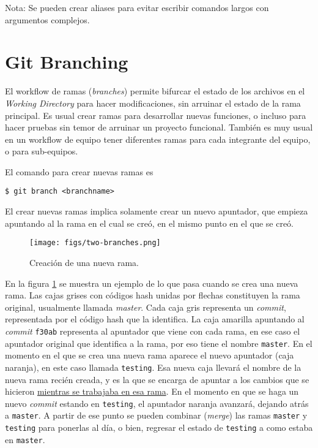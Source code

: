 \documentclass[spanish, 12pt, a4paper]{article}
\begin{document}
Nota: Se pueden crear aliases para evitar escribir comandos largos con
argumentos complejos.

\section{Git Branching}
El workflow de ramas (\textit{branches}) permite bifurcar el estado de los
archivos en el \textit{Working Directory} para hacer modificaciones, sin
arruinar el estado de la rama principal.
Es usual crear ramas para desarrollar nuevas funciones, o incluso para hacer
pruebas sin temor de arruinar un proyecto funcional.
También es muy usual en un workflow de equipo tener diferentes ramas para cada
integrante del equipo, o para sub-equipos.

El comando para crear nuevas ramas es
\begin{lstlisting}
$ git branch <branchname>
\end{lstlisting}

El crear nuevas ramas implica solamente crear un nuevo apuntador, que empieza
apuntando al la rama en el cual se creó, en el mismo punto en el que se creó.

\begin{figure}[h]
  \centering
  \texttt{[image: figs/two-branches.png]}
  \caption{Creación de una nueva rama.}
  \label{fig:two-branches}
\end{figure}

En la figura \ref{fig:two-branches} se muestra un ejemplo de lo que pasa cuando
se crea una nueva rama.
Las cajas grises con códigos hash unidas por flechas constituyen la rama
original, usualmente llamada \textit{master}.
Cada caja gris representa un \textit{commit}, representada por el código hash
que la identifica.
La caja amarilla apuntando al \textit{commit} \texttt{f30ab} representa al
apuntador que viene con cada rama, en ese caso el apuntador original que
identifica a la rama, por eso tiene el nombre \texttt{master}.
En el momento en el que se crea una nueva rama aparece el nuevo apuntador (caja
naranja), en este caso llamada \texttt{testing}.
Esa nueva caja llevará el nombre de la nueva rama recién creada, y es la que se
encarga de apuntar a los cambios que se hicieron \underline{mientras se
trabajaba en esa rama}.
En el momento en que se haga un nuevo \textit{commit} estando en
\texttt{testing}, el apuntador naranja avanzará, dejando atrás a
\texttt{master}.
A partir de ese punto se pueden combinar (\textit{merge}) las ramas
\texttt{master} y \texttt{testing} para ponerlas al día, o bien, regresar el
estado de \texttt{testing} a como estaba en \texttt{master}.
\end{document}
